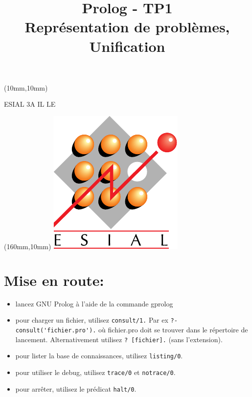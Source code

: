 \documentclass[a4paper]{article}
\title{Prolog - TP1\\Représentation de problèmes, Unification}
\date{}
\begin{document}
\maketitle
\begin{textblock*}{4cm}(10mm,10mm)
\begin{Large}ESIAL 3A IL LE\end{Large}
\end{textblock*}
\begin{textblock*}{3cm}(160mm,10mm)
\includegraphics[width=\textwidth]{../../ESIAL.pdf}
\end{textblock*}

\section*{Mise en route:}
\begin{itemize}
 \item lancez GNU Prolog à l'aide de la commande gprolog
 \item pour charger un fichier, utilisez \verb#consult/1.# Par ex 
       \verb#?­ consult('fichier.pro').# où fichier.pro doit se 
       trouver dans le répertoire de lancement. Alternativement utilisez
       \verb#?­ [fichier].# (sans l'extension).
 \item pour lister la base de connaissances, utilisez \verb#listing/0#.
 \item pour utiliser le debug, utilisez \verb#trace/0# et \verb#notrace/0#.
 \item pour arrêter, utilisez le prédicat \verb#halt/0#.
\end{itemize}
\end{document}
